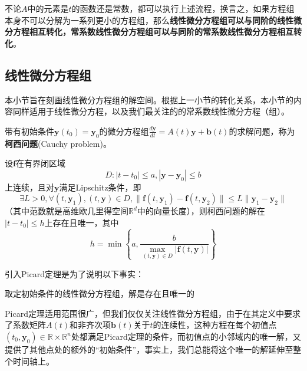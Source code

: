 \documentclass{ctexbook}
\begin{document}
不论$A$中的元素是$t$的函数还是常数，都可以执行上述流程，换言之，如果方程组本身不可以分解为一系列更小的方程组，那么\textbf{线性微分方程组可以与同阶的线性微分方程相互转化，常系数线性微分方程组可以与同阶的常系数线性微分方程相互转化}。

\subsection{线性微分方程组}\label{sub:solution_of_linear_equation_system}

本小节旨在刻画线性微分方程组的解空间。根据上一小节的转化关系，本小节的内容同样适用于线性微分方程，以及我们最关注的的常系数线性微分方程（组）。

\begin{definition}[柯西问题]
    带有初始条件$\mathbf{y}(t_0)=\mathbf{y}_0$的微分方程组$\frac{d\mathbf{y}}{dt}=A(t)\mathbf{y}+\mathbf{b}(t)$的求解问题，称为\textbf{柯西问题}(Cauchy problem)。
\end{definition}

\begin{claim}[Picard定理]
    设$\mathbf{f}$在有界闭区域
    $$D:|t-t_0|\leq a,|\mathbf{y}-\mathbf{y}_0|\leq b$$
    上连续，且对$\mathbf{y}$满足Lipschitz条件，即
    $$\exists L>0,\forall (t,\mathbf{y}_1),(t,\mathbf{y})\in D,\|\mathbf{f}(t,\mathbf{y}_1)-\mathbf{f}(t,\mathbf{y}_2)\|\leq L\|\mathbf{y}_1-\mathbf{y}_2\|$$
    （其中范数就是高维欧几里得空间$\mathbb{R}^d$中的向量长度），则柯西问题的解在$|t-t_0|\leq h$上存在且唯一，其中
    $$h=\min\left\{a,\frac{b}{\max_{(t,\mathbf{y})\in D}|\mathbf{f}(t,\mathbf{y})|}\right\}$$
\end{claim}


引入Picard定理是为了说明以下事实：
\begin{proposition}
    取定初始条件的线性微分方程组，解是存在且唯一的
\end{proposition}

Picard定理适用范围很广，但我们仅仅关注线性微分方程组，由于在其定义中要求了系数矩阵$A(t)$和非齐次项$\mathbf{b}(t)$关于$t$的连续性，这种方程在每个初值点$(t_0,\mathbf{y}_0)\in\mathbb{R} \times \mathbb{R}^n$处都满足Picard定理的条件，而初值点的小邻域内的唯一解，又提供了其他点处的额外的“初始条件”，事实上，我们总能将这个唯一的解延伸至整个时间轴上。
\end{document}
